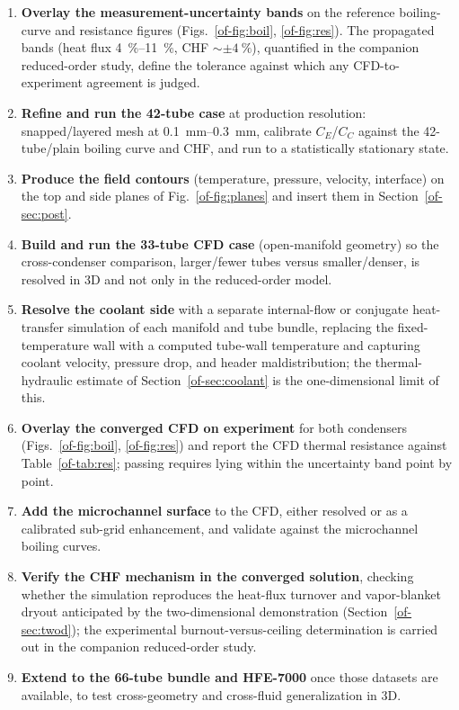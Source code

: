 \documentclass[11pt]{article}
\begin{document}
\begin{enumerate}
\item \textbf{Overlay the measurement-uncertainty bands} on the reference boiling-curve and
resistance figures (Figs.~\ref{of-fig:boil}, \ref{of-fig:res}). The propagated bands (heat flux
\SIrange{4}{11}{\%}, CHF $\sim\pm\SI{4}{\%}$), quantified in the companion reduced-order study,
define the tolerance against which any CFD-to-experiment agreement is judged.
\item \textbf{Refine and run the 42-tube case} at production resolution: snapped/layered mesh at
\SIrange{0.1}{0.3}{mm}, calibrate $C_E$/$C_C$ against the 42-tube/plain boiling curve and
CHF, and run to a statistically stationary state.
\item \textbf{Produce the field contours} (temperature, pressure, velocity, interface) on
the top and side planes of Fig.~\ref{of-fig:planes} and insert them in Section~\ref{of-sec:post}.
\item \textbf{Build and run the 33-tube CFD case} (open-manifold geometry) so the
cross-condenser comparison, larger/fewer tubes versus smaller/denser, is resolved in 3D and
not only in the reduced-order model.
\item \textbf{Resolve the coolant side} with a separate internal-flow or conjugate
heat-transfer simulation of each manifold and tube bundle, replacing the fixed-temperature
wall with a computed tube-wall temperature and capturing coolant velocity, pressure drop, and
header maldistribution; the thermal-hydraulic estimate of Section~\ref{of-sec:coolant} is the
one-dimensional limit of this.
\item \textbf{Overlay the converged CFD on experiment} for both condensers
(Figs.~\ref{of-fig:boil}, \ref{of-fig:res}) and report the CFD thermal resistance against
Table~\ref{of-tab:res}; passing requires lying within the uncertainty band point by point.
\item \textbf{Add the microchannel surface} to the CFD, either resolved or as a calibrated
sub-grid enhancement, and validate against the microchannel boiling curves.
\item \textbf{Verify the CHF mechanism in the converged solution}, checking whether the
simulation reproduces the heat-flux turnover and vapor-blanket dryout anticipated by the
two-dimensional demonstration (Section~\ref{of-sec:twod}); the experimental burnout-versus-ceiling
determination is carried out in the companion reduced-order study.
\item \textbf{Extend to the 66-tube bundle and HFE-7000} once those datasets are available,
to test cross-geometry and cross-fluid generalization in 3D.
\end{enumerate}
\end{document}
